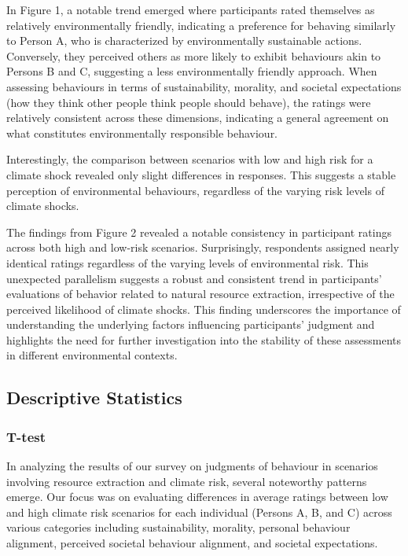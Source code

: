 \documentclass[11pt, a4paper, leqno]{article}
\begin{document}
\noindent In Figure 1, a notable trend emerged where participants rated themselves as relatively environmentally friendly, indicating a preference for behaving similarly to Person A, who is characterized by environmentally sustainable actions. Conversely, they perceived others as more likely to exhibit behaviours akin to Persons B and C, suggesting a less environmentally friendly approach. When assessing behaviours in terms of sustainability, morality, and societal expectations (how they think other people think people should behave), the ratings were relatively consistent across these dimensions, indicating a general agreement on what constitutes environmentally responsible behaviour.

\noindent Interestingly, the comparison between scenarios with low and high risk for a climate shock revealed only slight differences in responses. This suggests a stable perception of environmental behaviours, regardless of the varying risk levels of climate shocks.


The findings from Figure 2 revealed a notable consistency in participant ratings across both high and low-risk scenarios. Surprisingly, respondents assigned nearly identical ratings regardless of the varying levels of environmental risk. This unexpected parallelism suggests a robust and consistent trend in participants' evaluations of behavior related to natural resource extraction, irrespective of the perceived likelihood of climate shocks. This finding underscores the importance of understanding the underlying factors influencing participants' judgment and highlights the need for further investigation into the stability of these assessments in different environmental contexts.


\subsection{Descriptive Statistics}

\subsubsection{T-test}

In analyzing the results of our survey on judgments of behaviour in scenarios involving resource extraction and climate risk, several noteworthy patterns emerge. Our focus was on evaluating differences in average ratings between low and high climate risk scenarios for each individual (Persons A, B, and C) across various categories including sustainability, morality, personal behaviour alignment, perceived societal behaviour alignment, and societal expectations.
\end{document}
